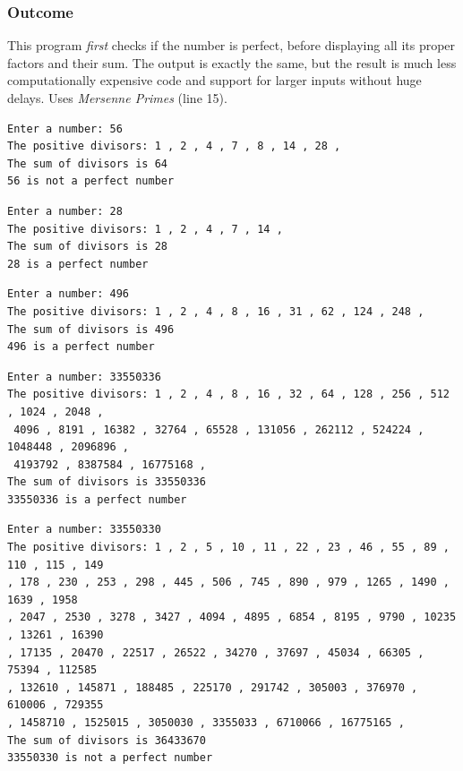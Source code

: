 \documentclass[a4paper,11pt]{article}
\theoremstyle{mytheor}
\theoremstyle{mytheor}
\begin{document}
\subsubsection{Outcome}
This program \textit{first} checks if the number is perfect, before displaying all its proper factors and their sum. The output is exactly the same, but the result is much less computationally expensive code and support for larger inputs without huge delays. Uses \textit{Mersenne Primes} (line 15).
\begin{lstlisting}[escapechar=\%,style=output,numbers=none,label={list:fourth},title=Program's output to console in plaintext -- \texttt{56} as input]
Enter a number: 56
The positive divisors: 1 , 2 , 4 , 7 , 8 , 14 , 28 ,
The sum of divisors is 64
56 is not a perfect number
\end{lstlisting}
\begin{lstlisting}[escapechar=\%,style=output,numbers=none,label={list:fifth},title=Program's output to console in plaintext -- \texttt{28} as input]
Enter a number: 28
The positive divisors: 1 , 2 , 4 , 7 , 14 ,
The sum of divisors is 28
28 is a perfect number
\end{lstlisting}
\begin{lstlisting}[escapechar=\%,style=output,numbers=none,label={list:sixth},title=Program's output to console in plaintext -- \texttt{496} as input]
Enter a number: 496
The positive divisors: 1 , 2 , 4 , 8 , 16 , 31 , 62 , 124 , 248 ,
The sum of divisors is 496
496 is a perfect number
\end{lstlisting}
\begin{lstlisting}[escapechar=\%,style=output,numbers=none,label={list:seventh},title=Program's output to console in plaintext -- \texttt{33550336} as input (perfect)]
Enter a number: 33550336
The positive divisors: 1 , 2 , 4 , 8 , 16 , 32 , 64 , 128 , 256 , 512 , 1024 , 2048 ,
 4096 , 8191 , 16382 , 32764 , 65528 , 131056 , 262112 , 524224 , 1048448 , 2096896 ,
 4193792 , 8387584 , 16775168 ,
The sum of divisors is 33550336
33550336 is a perfect number
\end{lstlisting}
\begin{lstlisting}[escapechar=\%,style=output,numbers=none,label={list:eighth},title=Program's output to console in plaintext -- \texttt{33550330} as input (not perfect)]
Enter a number: 33550330
The positive divisors: 1 , 2 , 5 , 10 , 11 , 22 , 23 , 46 , 55 , 89 , 110 , 115 , 149 
, 178 , 230 , 253 , 298 , 445 , 506 , 745 , 890 , 979 , 1265 , 1490 , 1639 , 1958 
, 2047 , 2530 , 3278 , 3427 , 4094 , 4895 , 6854 , 8195 , 9790 , 10235 , 13261 , 16390 
, 17135 , 20470 , 22517 , 26522 , 34270 , 37697 , 45034 , 66305 , 75394 , 112585 
, 132610 , 145871 , 188485 , 225170 , 291742 , 305003 , 376970 , 610006 , 729355 
, 1458710 , 1525015 , 3050030 , 3355033 , 6710066 , 16775165 , 
The sum of divisors is 36433670
33550330 is not a perfect number
\end{lstlisting}
\newpage
\end{document}
